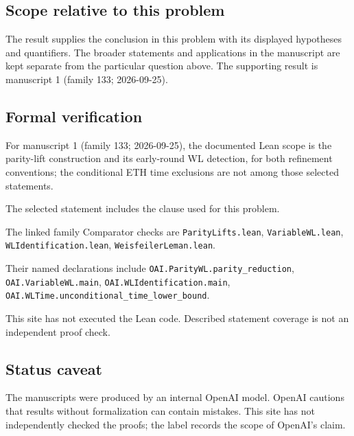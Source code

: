 \documentclass[11pt]{article}
\begin{document}
\subsection{Scope relative to this problem}
The result supplies the conclusion in this problem with its displayed hypotheses and quantifiers. The broader statements and applications in the manuscript are kept separate from the particular question above. The supporting result is manuscript 1 (family 133; 2026-09-25).

\subsection{Formal verification}
For manuscript 1 (family 133; 2026-09-25), the documented Lean scope is the parity-lift construction and its early-round WL detection, for both refinement conventions; the conditional ETH time exclusions are not among those selected statements.

The selected statement includes the clause used for this problem.

The linked family Comparator checks are \texttt{ParityLifts.lean}, \texttt{VariableWL.lean}, \texttt{WLIdentification.lean}, \texttt{WeisfeilerLeman.lean}.

Their named declarations include \texttt{OAI.ParityWL.parity\_reduction}, \texttt{OAI.VariableWL.main}, \texttt{OAI.WLIdentification.main}, \texttt{OAI.WLTime.unconditional\_time\_lower\_bound}.

This site has not executed the Lean code. Described statement coverage is not an independent proof check.

\subsection{Status caveat}
The manuscripts were produced by an internal OpenAI model. OpenAI cautions that results without formalization can contain mistakes. This site has not independently checked the proofs; the label records the scope of OpenAI's claim.
\end{document}
